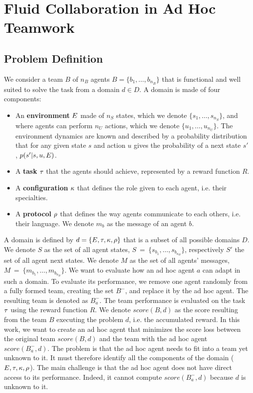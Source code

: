 \section{Fluid Collaboration in Ad Hoc Teamwork}
\label{sec:problem}

\subsection{Problem Definition}

We consider a team $B$ of $n_B$ agents $B = \{b_1, \ldots , b_{n_B}\}$ that is functional and well suited to solve the task from a domain $d \in D$. A domain is made of four components:

\begin{itemize}
\item An \textbf{environment} $E$ made of $n_S$ states, which we denote $\{s_1, \ldots, s_{n_S}\}$, and where agents can perform $n_U$ actions, which we denote $\{u_1, \ldots, u_{n_U}\}$. The environment dynamics are known and described by a probability distribution that for any given state $s$ and action $u$ gives the probability of a next state $s'$, $p(s'|s,u,E)$.
\item A \textbf{task} $\tau$ that the agents should achieve, represented by a reward function $R$.
\item A \textbf{configuration} $\kappa$ that defines the role given to each agent, i.e. their specialties.
\item A \textbf{protocol} $\rho$ that defines the way agents communicate to each others, i.e. their language. We denote $m_{b}$ as the message of an agent $b$.
\end{itemize}

A domain is defined by $d = \{E, \tau, \kappa, \rho\}$ that is a subset of all possible domains $D$. We denote $S$ as the set of all agent states, $ S~=~\{ s_{b_1}, \ldots, s_{b_{n_B}} \} $, respectively $S'$ the set of all agent next states. We denote $M$ as the set of all agents' messages, $M~=~\{m_{b_1}, \ldots, m_{b_{n_B}}\}$. We want to evaluate how an ad hoc agent $a$ can adapt in such a domain. To evaluate its performance, we remove one agent randomly from a fully formed team, creating the set $B^-$, and replace it by the ad hoc agent. The resulting team is denoted as $B^{-}_{a}$.
%
The team performance is evaluated on the task $\tau$ using the reward function $R$. We denote $score(B, d)$ as the score resulting from the team $B$ executing the problem $d$, i.e. the accumulated reward. In this work, we want to create an ad hoc agent that minimizes the score loss between the original team $score(B, d)$ and the team with the ad hoc agent $score(B^{-}_{a}, d)$. The problem is that the ad hoc agent needs to fit into a team yet unknown to it. It must therefore identify all the components of the domain ($E, \tau, \kappa, \rho$). The main challenge is that the ad hoc agent does not have direct access to its performance. Indeed, it cannot compute $score(B^{-}_{a}, d)$ because $d$ is unknown to it.

